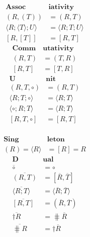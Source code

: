 \documentclass[11pt, oneside]{article}
\theoremstyle{plain}
\theoremstyle{definition}
\let\originaldagger\dagger
\renewcommand{\dag}{\mathord{\originaldagger}}
\newcommand{\la}{\langle}
\newcommand{\ra}{\rangle}
\newcommand{\unit}{\circ}
\begin{document}
\begin{figure}[ht!]
{\begin{minipage}{0.95\textwidth}
\begin{minipage}{0.45\textwidth}
                \begin{align*}
                    \textbf{Assoc}&\textbf{iativity} \\
                    (R,(T)) &= (R,T) \\
                    \la R;\la T\ra; U\ra &= \la R;T;U\ra \\
                    [R,[T]] &= [R,T]
                \end{align*}
                \begin{align*}
                    \textbf{Comm}&\textbf{utativity}\\
                    (R, T) &= (T, R) \\
                    [R, T] &= [T, R]
                \end{align*}
                \begin{align*}
                    \textbf{U}&\textbf{nit} \\
                    (R,T,\unit) &= (R,T) \\
                    \la R;T;\unit\ra &= \la R;T\ra \\
                    \la\unit;R;T\ra &= \la R;T\ra \\
                    [R,T,\unit] &= [R,T] \\
                \end{align*}
            \end{minipage}
            \hfill
            \begin{minipage}{0.45\textwidth}
                \begin{align*}
                    \textbf{Sing}&\textbf{leton} \\
                    (R) = \la R\ra &= [R] = R
                \end{align*}
                \begin{align*}
                    \textbf{D}&\textbf{ual} \\
                    \overline{\unit} &= \unit \\
                    \overline{(R,T)} &= [\overline{R},\overline{T}] \\
                    \overline{\la R;T\ra} &= \la \overline{R};\overline{T}\ra \\
                    \overline{[R,T]} &= (\overline{R},\overline{T}) \\
                    \overline{\dag R} &= \hash\overline{R} \\
                    \overline{\hash R} &= \dag \overline{R} \\

\end{align*}
\end{minipage}
\end{minipage}}
\end{figure}
\end{document}
